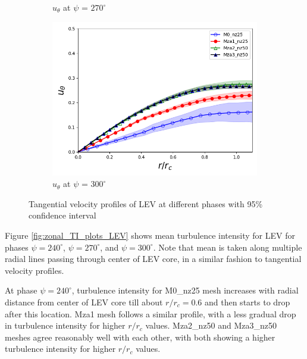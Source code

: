 \begin{figure}[H]
\begin{subfigure}[b]{0.475\textwidth}
	\caption{ $u_\theta$ at $\psi$ = $270^\circ$}
	\label{fig:zonal_utheta_270}
    \end{subfigure}
	\begin{subfigure}[b]{0.475\textwidth}
	\centering
	\includegraphics[width=1\textwidth]{figures/zonal_adapt_results/LEV/u_theta/phase_300.png}
	\caption{ $u_\theta$ at $\psi$ = $300^\circ$}
	\label{fig:zonal_utheta_300}
	\end{subfigure}
   	\caption{Tangential velocity profiles of LEV at different phases with 95\% confidence interval}
   	\label{fig:zonal_utheta_LEV}
\end{figure}



Figure \ref{fig:zonal_TI_plots_LEV} shows mean turbulence intensity for LEV for phases $\psi = 240^\circ$, $\psi = 270^\circ$, and $\psi = 300^\circ$. 
Note that mean is taken along multiple radial lines passing through center of LEV core, in a similar fashion to tangential velocity profiles.

At phase $\psi = 240^\circ$, turbulence intensity for M0\_nz25 mesh increases with radial distance from center of LEV core till about $r/r_c = 0.6$ and then starts to drop after this location.
Mza1 mesh follows a similar profile, with a less gradual drop in turbulence intensity for higher $r/r_c $ values.
Mza2\_nz50 and Mza3\_nz50 meshes agree reasonably well with each other, with both showing a higher turbulence intensity for higher $r/r_c$ values.


